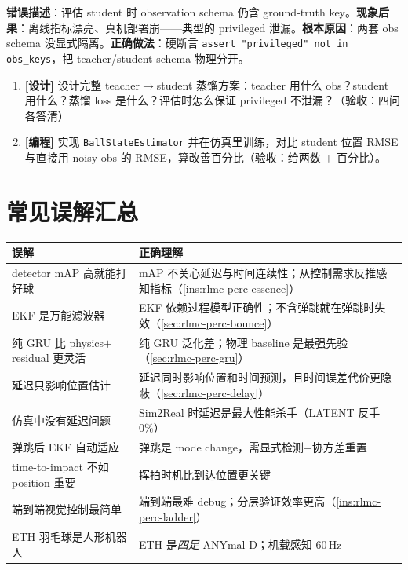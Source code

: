 \begin{pitfall}
\textbf{错误描述}：评估 student 时 observation schema 仍含 ground-truth key。\textbf{现象后果}：离线指标漂亮、真机部署崩——典型的 privileged 泄漏。\textbf{根本原因}：两套 obs schema 没显式隔离。\textbf{正确做法}：硬断言 \verb|assert "privileged" not in obs_keys|，把 teacher/student schema 物理分开。
\end{pitfall}

\begin{practice}[本节动手任务]
\begin{enumerate}
  \item \textbf{[设计]} 设计完整 teacher$\to$student 蒸馏方案：teacher 用什么 obs？student 用什么？蒸馏 loss 是什么？评估时怎么保证 privileged 不泄漏？（验收：四问各答清）
  \item \textbf{[编程]} 实现 \verb|BallStateEstimator| 并在仿真里训练，对比 student 位置 RMSE 与直接用 noisy obs 的 RMSE，算改善百分比（验收：给两数 $+$ 百分比）。
\end{enumerate}
\end{practice}

\section*{常见误解汇总}
\label{sec:rlmc-perc-myths}

\begin{center}
\small
\begin{tabular}{@{}p{6.2cm}p{8.0cm}@{}}
\toprule
误解 & 正确理解 \\
\midrule
detector mAP 高就能打好球 & mAP 不关心延迟与时间连续性；从控制需求反推感知指标（\cref{ins:rlmc-perc-essence}） \\
EKF 是万能滤波器 & EKF 依赖过程模型正确性；不含弹跳就在弹跳时失效（\cref{sec:rlmc-perc-bounce}） \\
纯 GRU 比 physics$+$residual 更灵活 & 纯 GRU 泛化差；物理 baseline 是最强先验（\cref{sec:rlmc-perc-gru}） \\
延迟只影响位置估计 & 延迟同时影响位置和时间预测，且时间误差代价更隐蔽（\cref{sec:rlmc-perc-delay}） \\
仿真中没有延迟问题 & Sim2Real 时延迟是最大性能杀手（LATENT 反手 $0\%$） \\
弹跳后 EKF 自动适应 & 弹跳是 mode change，需显式检测$+$协方差重置 \\
time-to-impact 不如 position 重要 & 挥拍时机比到达位置更关键 \\
端到端视觉控制最简单 & 端到端最难 debug；分层验证效率更高（\cref{ins:rlmc-perc-ladder}） \\
ETH 羽毛球是人形机器人 & ETH 是\emph{四足} ANYmal-D；机载感知 $60$\,Hz \\
\bottomrule
\end{tabular}
\end{center}

